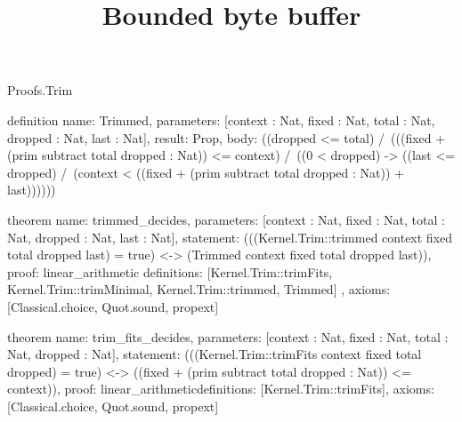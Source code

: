 \begin{lexlean}{Proofs.Trim}
\title{Bounded byte buffer}
\begin{semanticmodule}
definition{
  name: Trimmed,
  parameters: [context : Nat, fixed : Nat, total : Nat, dropped : Nat, last : Nat],
  result: Prop,
  body: ((dropped <= total) /\ (((fixed + (prim subtract total dropped : Nat)) <= context) /\ ((0 < dropped) -> ((last <= dropped) /\ (context < ((fixed + (prim subtract total dropped : Nat)) + last))))))
}

theorem{
  name: trimmed_decides,
  parameters: [context : Nat, fixed : Nat, total : Nat, dropped : Nat, last : Nat],
  statement: (((Kernel.Trim::trimmed context fixed total dropped last) = true) <-> (Trimmed context fixed total dropped last)),
  proof: linear_arithmetic{
    definitions: [Kernel.Trim::trimFits, Kernel.Trim::trimMinimal, Kernel.Trim::trimmed, Trimmed]
  },
  axioms: [Classical.choice, Quot.sound, propext]
}

theorem{
  name: trim_fits_decides,
  parameters: [context : Nat, fixed : Nat, total : Nat, dropped : Nat],
  statement: (((Kernel.Trim::trimFits context fixed total dropped) = true) <-> ((fixed + (prim subtract total dropped : Nat)) <= context)),
  proof: linear_arithmetic{definitions: [Kernel.Trim::trimFits]},
  axioms: [Classical.choice, Quot.sound, propext]
}
\end{semanticmodule}
\end{lexlean}
